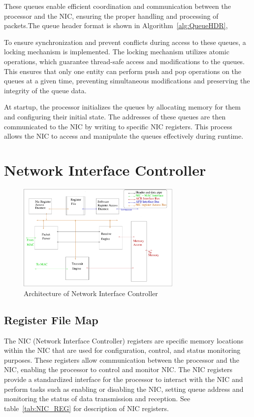 \documentclass[12pt]{report}
\begin{document}
These queues enable efficient coordination and communication between the processor and the NIC, ensuring the proper handling and processing of packets.The queue header format is shown in Algorithm~\ref{alg:QueueHDR},


To ensure synchronization and prevent conflicts during access to these queues, a locking mechanism is implemented. The locking mechanism utilizes atomic operations, which guarantee thread-safe access and modifications to the queues. This ensures that only one entity can perform push and pop operations on the queues at a given time, preventing simultaneous modifications and preserving the integrity of the queue data.


At startup, the processor initializes the queues by allocating memory for them and configuring their initial state. The addresses of these queues are then communicated to the NIC by writing to specific NIC registers. This process allows the NIC to access and manipulate the queues effectively during runtime. 


	\section{Network Interface Controller}
		

		\begin{figure}[h!]
			\centering
			\includegraphics[width=8cm]{./figures/NIC_Internal.pdf}
			\caption{Architecture of Network Interface Controller}
			\label{fig:NIC-Arch}
		\end{figure}

		\subsection{Register File Map} \label{subsec:NIC_REG}
				The NIC (Network Interface Controller) registers are specific memory locations within the NIC that are used for configuration, control, and status monitoring purposes. These registers allow communication between the processor and the NIC, enabling the processor to control and monitor NIC. The NIC registers provide a standardized interface for the processor to interact with the NIC and perform tasks such as enabling or disabling the NIC, setting queue address and monitoring the status of data transmission and reception. See table~\ref{tab:NIC_REG} for description of NIC registers.
\end{document}
